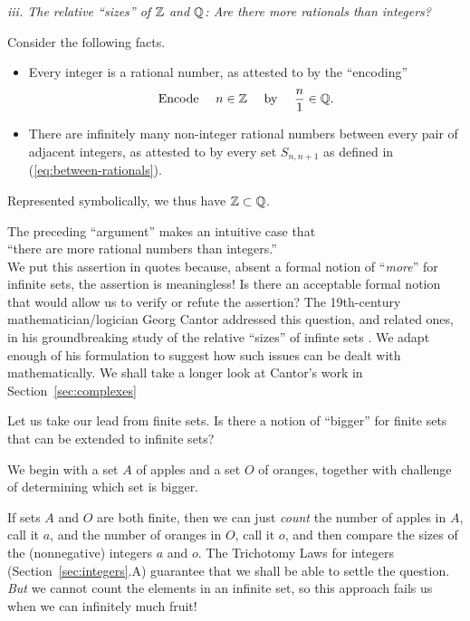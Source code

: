 \medskip

{\it iii. The relative ``sizes'' of $\mathbb{Z}$ and $\mathbb{Q}$: Are there more
  rationals than integers?}

\noindent Consider the following facts.
\begin{itemize}
\item
Every integer is a rational number, as attested to by the ``encoding''
\begin{equation}
\label{eq:ZintoQ}
\mbox{Encode } \ \ \ n \in \mathbb{Z} \ \ \ \mbox{ by } \ \ \ {n \over 1} \in \mathbb{Q} .
\end{equation}

\item
There are infinitely many non-integer rational numbers between every
pair of adjacent integers, as attested to by every set $S_{n,n+1}$ as
defined in (\ref{eq:between-rationals}).
\end{itemize}
Represented symbolically, we thus have $\mathbb{Z} \subset \mathbb{Q}$.

\medskip

\noindent
The preceding ``argument'' makes an intuitive case that \\
\hspace*{.35in}``there are more rational numbers than integers.'' \\ 
We put this assertion in quotes because, absent a formal notion of
``{\em more}'' for infinite sets, the assertion is meaningless!  Is
there an acceptable formal notion that would allow us to verify or
refute the assertion?  The 19th-century mathematician/logician Georg
Cantor addressed this question, and related ones, in his
groundbreaking study of the relative ``sizes'' of infinte sets
\cite{Cantor74,Cantor78}.  We adapt enough of his formulation to
suggest how such issues can be dealt with mathematically.  We shall
take a longer look at Cantor's work in Section~\ref{sec:complexes}

Let us take our lead from finite sets.  Is there a notion of
``bigger'' for finite sets that can be extended to infinite sets?

We begin with a set $A$ of apples and a set $O$ of oranges, together
with challenge of determining which set is bigger.

\medskip

If sets $A$ and $O$ are both finite, then we can just {\em count} the
number of apples in $A$, call it $a$, and the number of oranges in
$O$, call it $o$, and then compare the sizes of the (nonnegative)
integers $a$ and $o$.  The Trichotomy Laws for integers
(Section~\ref{sec:integers}.A) guarantee that we shall be able to
settle the question.  {\em But} we cannot count the elements in an
infinite set, so this approach fails us when we can infinitely much
fruit!

